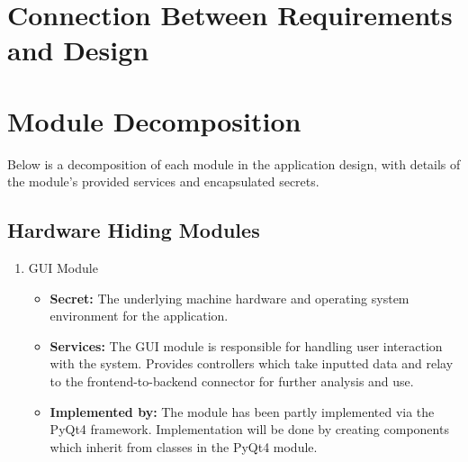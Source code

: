 \documentclass{article}
\begin{document}


\section*{Connection Between Requirements and Design}

\section*{Module Decomposition}
Below is a decomposition of each module in the application design, with details of the module's provided services and encapsulated secrets.

\subsection{Hardware Hiding Modules}
\begin{enumerate}
\item
GUI Module

\begin{itemize}
\item
\textbf{Secret:} The underlying machine hardware and operating system environment for the application.

\item
\textbf{Services:} The GUI module is responsible for handling user interaction with the system. Provides controllers which take inputted data and relay to the frontend-to-backend connector for further analysis and use.

\item
\textbf{Implemented by:} The module has been partly implemented via the PyQt4 framework. Implementation will be done by creating components which inherit from classes in the PyQt4 module.
\end{itemize}
\end{enumerate}
\end{document}
